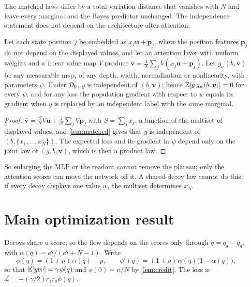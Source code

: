 The matched laws differ by a total-variation distance that vanishes with $N$ and leave every marginal and the Bayes predictor unchanged.
The independence statement does not depend on the architecture after attention.

\begin{corollary}
\label{cor:uniform}
Let each state position $j$ be embedded as $x_j\bm u+\bm p_j$, where the position features $\bm p_j$ do not depend on the displayed values, and let an attention
layer with uniform weights and a linear value map $V$ produce $\bar{\bm v}=\frac1N\sum_jV(x_j\bm u+\bm p_j)$. Let $g_\psi(b,\bar{\bm v})$ be any measurable map, of any depth,
width, normalization or nonlinearity, with parameters $\psi$. Under $\mathcal D_{0}$, $y$ is independent of $(b,\bar{\bm v})$; hence $\mathbb E[y\,g_\psi(b,\bar{\bm v})]=0$ for every $\psi$, and
for any loss the population gradient with respect to $\psi$ equals its gradient when $y$ is replaced by an independent label with the same marginal.
\end{corollary}
\begin{proof}
$\bar{\bm v}=\frac{S}{N}V\bm u+\frac1N\sum_jV\bm p_j$ with $S=\sum_jx_j$, a function of the multiset of displayed values, and \cref{lem:matched} gives that $y$ is independent of
$(b,\{x_1,\ldots,x_N\})$. The expected loss and its gradient in $\psi$ depend only on the joint law of $(y,b,\bar{\bm v})$, which is then a product law.
\end{proof}
So enlarging the MLP or the readout cannot remove the plateau; only the attention scores can move the network off it.
A shared-decoy law cannot do this: if every decoy displays one value $w$, the multiset determines $x_N$.

\section{Main optimization result}
\label{sec:dynamics}

Decoys share a score, so the flow depends on the scores only through $q=q_s-q_d$, with
$\alpha(q)=e^q/(e^q+N-1)$. Write
\[
 \phi(q)=(1+\rho)\,\alpha(q)-\rho,\qquad \phi'(q)=(1+\rho)\,\alpha(q)\bigl(1-\alpha(q)\bigr),
\]
so that $\mathbb E[y b v]=\gamma\,\phi(q)$ and $\phi(0)=\kappa/N$ by \cref{lem:credit}. The loss is $\mathcal L=-(\gamma/2)r_1r_2\phi(q)$.

